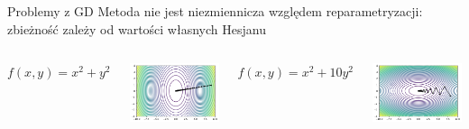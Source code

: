\documentclass[unknownkeysallowed]{beamer}
\begin{document}
\begin{frame}{Problemy z GD}
  Metoda nie jest niezmiennicza względem reparametryzacji: zbieżność zależy od wartości własnych Hesjanu
    \begin{columns}

        \begin{center}$f(x,y ) = x^2 + y^2$\end{center}
        \includegraphics[width=\textwidth]{GD1.png} 
        \begin{center}$f(x,y ) = x^2 + 10 y^2$\end{center}
        \includegraphics[width=\textwidth]{GD10.png} 
    \end{columns}
\end{frame}
\end{document}
